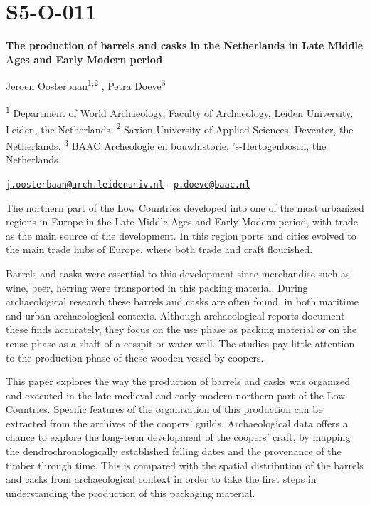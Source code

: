 \documentclass[
]{book}
\begin{document}
\hypertarget{s5-o-011}{%
\section*{S5-O-011}\label{s5-o-011}}

\textbf{The production of barrels and casks in the Netherlands in Late Middle Ages and Early Modern period}

Jeroen Oosterbaan\textsuperscript{1,2} , Petra Doeve\textsuperscript{3}

\textsuperscript{1} Department of World Archaeology, Faculty of Archaeology, Leiden University, Leiden, the Netherlands. \textsuperscript{2} Saxion University of Applied Sciences, Deventer, the Netherlands. \textsuperscript{3} BAAC Archeologie en bouwhistorie, 's-Hertogenbosch, the Netherlands.

\href{mailto:j.oosterbaan@arch.leidenuniv.nl}{\nolinkurl{j.oosterbaan@arch.leidenuniv.nl}} - \href{mailto:p.doeve@baac.nl}{\nolinkurl{p.doeve@baac.nl}}

The northern part of the Low Countries developed into one of the most urbanized regions in Europe in the Late Middle Ages and Early Modern period, with trade as the main source of the development. In this region ports and cities evolved to the main trade hubs of Europe, where both trade and craft flourished.

Barrels and casks were essential to this development since merchandise such as wine, beer, herring were transported in this packing material. During archaeological research these barrels and casks are often found, in both maritime and urban archaeological contexts. Although archaeological reports document these finds accurately, they focus on the use phase as packing material or on the reuse phase as a shaft of a cesspit or water well. The studies pay little attention to the production phase of these wooden vessel by coopers.

This paper explores the way the production of barrels and casks was organized and executed in the late medieval and early modern northern part of the Low Countries. Specific features of the organization of this production can be extracted from the archives of the coopers' guilds. Archaeological data offers a chance to explore the long-term development of the coopers' craft, by mapping the dendrochronologically established felling dates and the provenance of the timber through time. This is compared with the spatial distribution of the barrels and casks from archaeological context in order to take the first steps in understanding the production of this packaging material.
\end{document}
